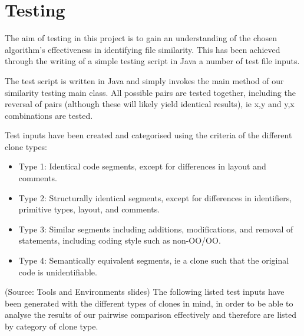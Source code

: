 \section{Testing}
The aim of testing in this project is to gain an understanding of the chosen algorithm's effectiveness in identifying file similarity. This has been achieved through the writing of a simple testing script in Java a number of test file inputs.

The test script is written in Java and simply invokes the main method of our similarity testing main class. All possible pairs are tested together, including the reversal of pairs (although these will likely yield identical results), ie x,y and y,x combinations are tested.  

Test inputs have been created and categorised using the criteria of the different clone types:
\begin{itemize}
\item Type 1: Identical code segments, except for differences in layout and comments.
\item Type 2: Structurally identical segments, except for differences in identifiers, primitive types, layout, and comments.
\item Type 3: Similar segments including additions, modifications, and removal of statements, including coding style such as non-OO/OO.
\item Type 4: Semantically equivalent segments, ie a clone such that the original code is unidentifiable.
\end{itemize}
(Source: Tools and Environments slides)
The following listed test inputs have been generated with the different types of clones in mind, in order to be able to analyse the results of our pairwise comparison effectively and therefore are listed by category of clone type.

